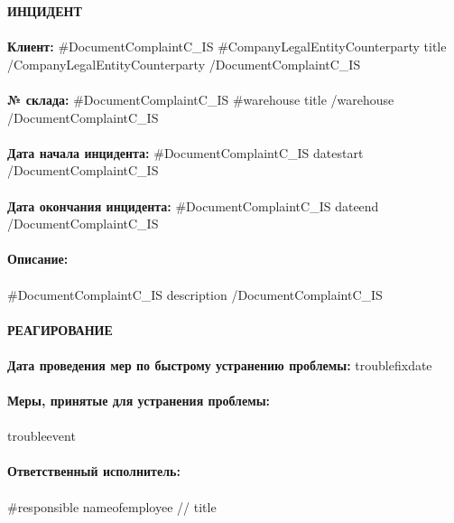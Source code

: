 {{{{{{{\noindent \textbf{ИНЦИДЕНТ} \\
\vspace{1mm} \\
\textbf{Клиент:} {{#DocumentComplaintC_IS}} {{#CompanyLegalEntityCounterparty}} {{title}} {{/CompanyLegalEntityCounterparty}} {{/DocumentComplaintC_IS}}  \\
\vspace{1mm} \\
\textbf{№ склада:}  {{#DocumentComplaintC_IS}}  {{#warehouse}} {{title}} {{/warehouse}} {{/DocumentComplaintC_IS}}   \\
\vspace{1mm} \\
\textbf{Дата начала инцидента:} {{#DocumentComplaintC_IS}} {{datestart}}  {{/DocumentComplaintC_IS}}  \\
\vspace{1mm} \\
\textbf{Дата окончания инцидента:}  {{#DocumentComplaintC_IS}} {{dateend}}  {{/DocumentComplaintC_IS}}  \\
\vspace{1mm} \\
\textbf{Описание:} \\
\vspace{1mm} \\
{{#DocumentComplaintC_IS}} {{description}} {{/DocumentComplaintC_IS}}  \\
\vspace{7mm} \\
\noindent\textbf{РЕАГИРОВАНИЕ} \\
\vspace{1mm} \\
\noindent\textbf{Дата проведения мер по быстрому устранению проблемы:} {{troublefixdate}}  \\
\vspace{1mm} \\
\noindent\textbf{Меры, принятые для устранения проблемы:} \\
\vspace{1mm} \\
 {{troubleevent}} \\
 \vspace{1mm} \\
\noindent\textbf{Ответственный исполнитель:} \\
\vspace{1mm} \\
{{#responsible}}
 {{nameofemployee}} // {{title}}  \\
}}}}}}}
